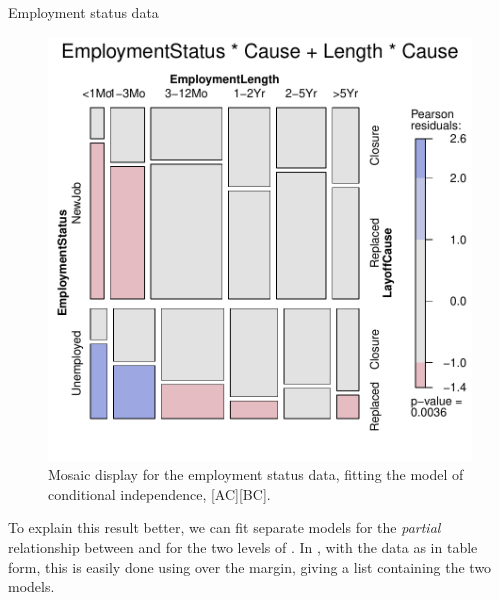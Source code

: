 \documentclass[11pt]{book}
\renewenvironment{knitrout}{\small\renewcommand{\baselinestretch}{.85}}{} %
\begin{document}
\begin{Example}[employ]{Employment status data}
\begin{knitrout}
\begin{figure}[!htbp]
\centerline{\includegraphics[width=.6\textwidth]{ch05/fig/employ-mos2} }

\caption[Mosaic display for the employment status data, fitting the model of conditional independence]{Mosaic display for the employment status data, fitting the model of conditional independence, [AC][BC].\label{fig:employ-mos2}}
\end{figure}


\end{knitrout}

To explain this result better, we can fit separate models for the \emph{partial}
relationship between  and 
for the two levels of . In \R, with the  data
as in table form, this is easily done using  over the 
 margin, giving a list containing the two  models.


\end{Example}
\end{document}
